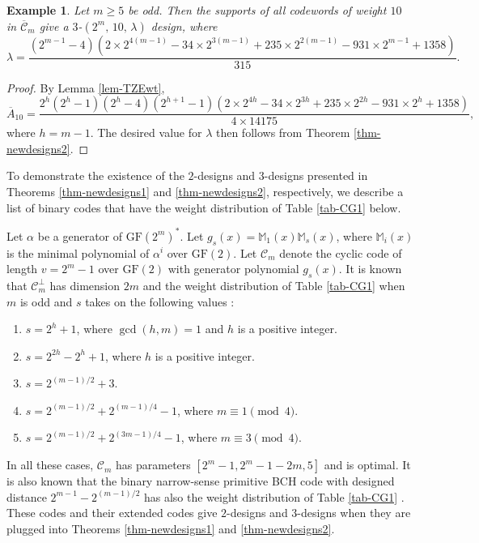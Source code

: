 \documentclass[1p,final]{elsarticle}
\newtheorem{example}{Example}
\newcommand{\gf}{{\mathrm{GF}}}
\newcommand{\m}{\mathbb{M}}
\newcommand{\C}{{\mathcal{C}}}
\begin{document}
\begin{example} 
Let $m \geq 5$ be odd. 
Then the supports of all codewords of weight $10$ in $\overline{\C}_m$ give a $3$-$(2^m,\, 10,\, \lambda)$ design, where 
$$ 
\lambda= \frac{ (2^{m-1}-4)  (2 \times 2^{4(m-1)} - 34 \times 2^{3(m-1)} + 235 \times  2^{2(m-1)} - 931 \times  2^{m-1} + 1358)}{315}. 
$$
\end{example} 

\begin{proof}
By Lemma  \ref{lem-TZEwt}, 
$$ 
\overline{A}_{10} = \frac{2^{h} (2^{h}-1) (2^{h}-4)   (2^{h+1}-1) (2\times 2^{4h} - 34 \times  2^{3h} + 235 \times  2^{2h} - 931 \times  2^{h} + 1358)}{4\times 14175}, 
$$
where $h=m-1$. 
The desired value for $\lambda$ then follows from Theorem \ref{thm-newdesigns2}. 
\end{proof}




To demonstrate the existence of the $2$-designs and $3$-designs presented in Theorems \ref{thm-newdesigns1} and \ref{thm-newdesigns2}, respectively, we describe a list of binary codes that 
have the weight distribution of Table \ref{tab-CG1} below.


Let $\alpha$ be a generator of $\gf(2^m)^*$. Let $g_s(x)=\m_1(x)\m_s(x)$, where $\m_i(x)$ is the
minimal polynomial of $\alpha^i$ over $\gf(2)$. Let $\C_m$ denote the cyclic code of length
$v=2^m-1$ over $\gf(2)$ with generator polynomial $g_s(x)$. It is known that $\C_m^\perp$ has 
dimension $2m$ and the weight distribution of Table \ref{tab-CG1} when $m$ is odd and $s$ takes on the
following values \cite{DLLZ}:
\begin{enumerate}
\item $s=2^h+1$, where $\gcd(h, m)=1$ and $h$ is a positive integer.
\item $s=2^{2h}-2^h+1$, where $h$ is a positive integer.
\item $s=2^{(m-1)/2}+3$.
\item $s=2^{(m-1)/2}+2^{(m-1)/4}-1$, where $m \equiv 1 \pmod{4}$.
\item $s=2^{(m-1)/2}+2^{(3m-1)/4}-1$, where $m \equiv 3 \pmod{4}$.
\end{enumerate}
In all these cases, $\C_m$ has parameters $[2^m-1, 2^m-1-2m, 5]$ and is optimal.
It is also known that the binary narrow-sense primitive BCH code with designed distance
$2^{m-1}-2^{(m-1)/2}$ has also the weight distribution of Table \ref{tab-CG1} \cite{DFZ}.
These codes
and their extended codes give $2$-designs and $3$-designs when they are plugged into Theorems
\ref{thm-newdesigns1} and \ref{thm-newdesigns2}.
\end{document}
